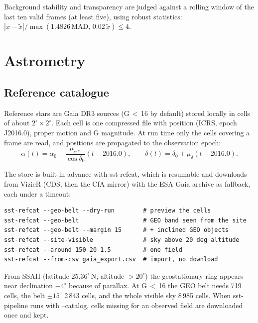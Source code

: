\documentclass[11pt,a4paper]{article}
\newcommand{\brkus}{\textunderscore\allowbreak}
\newcommand{\code}[1]{{\ttfamily\let\_\brkus #1}}
\begin{document}
Background stability and transparency are judged against a rolling window of the last ten
valid frames (at least five), using robust statistics:
$|x - \tilde{x}| / \max(1.4826\,\mathrm{MAD},\,0.02\,\tilde{x}) \leq 4$.

\section{Astrometry}

\subsection{Reference catalogue}\label{sec:refcat}
Reference stars are Gaia DR3 \cite{gaia2023} sources (G\,$<$\,16 by default) stored locally in
cells of about $2^\circ\times2^\circ$. Each cell is one compressed file with position (ICRS,
epoch J2016.0), proper motion and G magnitude. At run time only the cells covering a
frame are read, and positions are propagated to the observation epoch:
\begin{equation}
\alpha(t) = \alpha_0 + \frac{\mu_{\alpha*}}{\cos\delta_0}(t - 2016.0),\qquad
\delta(t) = \delta_0 + \mu_\delta (t - 2016.0).
\end{equation}

The store is built in advance with \code{sst-refcat}, which is resumable and downloads
from VizieR (CDS, then the CfA mirror) with the ESA Gaia archive as fallback, each under a
timeout:

\noindent\begin{minipage}{\linewidth}
\begin{lstlisting}
sst-refcat --geo-belt --dry-run        # preview the cells
sst-refcat --geo-belt                  # GEO band seen from the site
sst-refcat --geo-belt --margin 15      # + inclined GEO objects
sst-refcat --site-visible              # sky above 20 deg altitude
sst-refcat --around 150 20 1.5         # one field
sst-refcat --from-csv gaia_export.csv  # import, no download
\end{lstlisting}
\end{minipage}\par

From SSAH (latitude $25.36^\circ$\,N, altitude $>20^\circ$) the geostationary ring appears
near declination $-4^\circ$ because of parallax. At G\,$<$\,16 the GEO belt needs 719 cells,
the belt $\pm15^\circ$ 2\,843 cells, and the whole visible sky 8\,985 cells. When
\code{sst-pipeline} runs with \code{--catalog}, cells missing for an observed field are
downloaded once and kept.
\end{document}
